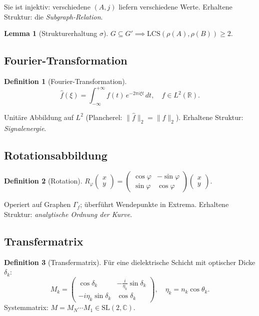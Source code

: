﻿\documentclass[a4paper,12pt]{scrreprt}
\theoremstyle{definition}
\newtheorem{definition}{Definition}[section]
\newtheorem{lemma}{Lemma}[section]
\begin{document}
Sie ist injektiv: verschiedene $(A,j)$ liefern verschiedene Werte.
Erhaltene Struktur: die \emph{Subgraph-Relation}.

\begin{lemma}[Strukturerhaltung $\sigma$]
  $G \subseteq G' \implies \mathrm{LCS}(\rho(A),\rho(B)) \geq 2.$
\end{lemma}

\subsection{Fourier-Transformation}

\begin{definition}[Fourier-Transformation]
  \[
    \hat{f}(\xi) = \int_{-\infty}^{+\infty} f(t)\,e^{-2\pi i\xi t}\,dt,
    \quad f \in L^2(\mathbb{R}).
  \]
\end{definition}

Unitäre Abbildung auf $L^2$ (Plancherel: $\|\hat f\|_2 = \|f\|_2$).
Erhaltene Struktur: \emph{Signalenergie}.

\subsection{Rotationsabbildung}

\begin{definition}[Rotation]
  $R_\varphi \begin{pmatrix}x\\y\end{pmatrix}
  = \begin{pmatrix}\cos\varphi & -\sin\varphi\\\sin\varphi &
  \cos\varphi\end{pmatrix}\begin{pmatrix}x\\y\end{pmatrix}.$
\end{definition}

Operiert auf Graphen $\Gamma_f$; überführt Wendepunkte in Extrema.
Erhaltene Struktur: \emph{analytische Ordnung der Kurve}.

\subsection{Transfermatrix}

\begin{definition}[Transfermatrix]
  Für eine dielektrische Schicht mit optischer Dicke $\delta_k$:
  \[
    M_k = \begin{pmatrix}
      \cos\delta_k & -\tfrac{i}{\eta_k}\sin\delta_k \\
      -i\eta_k\sin\delta_k & \cos\delta_k
    \end{pmatrix}, \quad \eta_k = n_k\cos\theta_k.
  \]
  Systemmatrix: $M = M_N \cdots M_1 \in \mathrm{SL}(2,\mathbb{C})$.
\end{definition}
\end{document}
